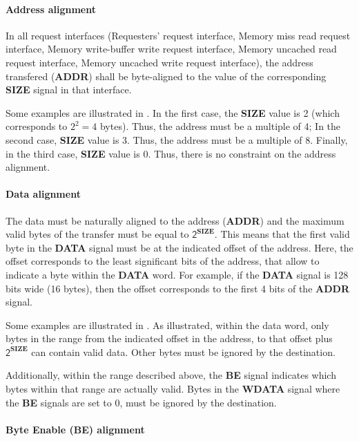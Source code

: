 \documentclass[10pt,titlepage,twoside]{book}
\begin{document}
\paragraph{Address alignment}\mbox{}

In all request interfaces (Requesters' request interface, Memory miss read request interface, Memory write-buffer write request interface, Memory uncached read request interface, Memory uncached write request interface), the address transfered (\textbf{ADDR}) shall be byte-aligned to the value of the corresponding \textbf{SIZE} signal in that interface.

Some examples are illustrated in .
In the first case, the \textbf{SIZE} value is 2 (which corresponds to $2^2=4$ bytes).
Thus, the address must be a multiple of 4;
In the second case, \textbf{SIZE} value is 3.
Thus, the address must be a multiple of 8.
Finally, in the third case, \textbf{SIZE} value is 0.
Thus, there is no constraint on the address alignment.

\paragraph{Data alignment}\mbox{}

The data must be naturally aligned to the address (\textbf{ADDR}) and the maximum valid bytes of the transfer must be equal to $\mathsf{2^\mathbf{SIZE}}$.
This means that the first valid byte in the \textbf{DATA} signal must be at the indicated offset of the address.
Here, the offset corresponds to the least significant bits of the address, that allow to indicate a byte within the \textbf{DATA} word.
For example, if the \textbf{DATA} signal is 128 bits wide (16 bytes), then the offset corresponds to the first 4 bits of the \textbf{ADDR} signal.

Some examples are illustrated in .
As illustrated, within the data word, only bytes in the range from the indicated offset in the address, to that offset plus $\mathsf{2^\mathbf{SIZE}}$ can contain valid data.
Other bytes must be ignored by the destination.

Additionally, within the range described above, the \textbf{BE} signal indicates which bytes within that range are actually valid.
Bytes in the \textbf{WDATA} signal where the \textbf{BE} signals are set to 0, must be ignored by the destination.

\paragraph{Byte Enable (BE) alignment}\mbox{}
\end{document}
